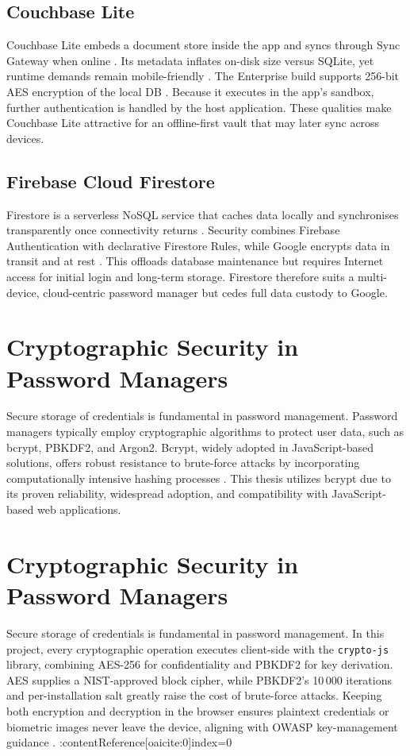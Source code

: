 \subsection*{Couchbase Lite}
Couchbase Lite embeds a document store inside the app and syncs through
Sync Gateway when online \autocite{Pal2016}.  Its metadata inflates on-disk
size versus SQLite, yet runtime demands remain mobile-friendly
\autocite{Gkamas2022}.  The Enterprise build supports 256-bit AES encryption
of the local DB \autocite{CouchbaseEncryption, CouchbaseDoc2025}.  Because it
executes in the app's sandbox, further authentication is handled by the host
application.  These qualities make Couchbase Lite attractive for an
offline-first vault that may later sync across devices.

\subsection*{Firebase Cloud Firestore}
Firestore is a serverless NoSQL service that caches data locally and
synchronises transparently once connectivity returns \autocite{FirebaseDoc2025}.
Security combines Firebase Authentication with declarative Firestore Rules,
while Google encrypts data in transit and at rest \autocite{FirebaseSecurity2025}.
This offloads database maintenance but requires Internet access for initial
login and long-term storage.  Firestore therefore suits a multi-device,
cloud-centric password manager but cedes full data custody to Google.

\section{Cryptographic Security in Password Managers}
Secure storage of credentials is fundamental in password management. Password managers typically employ cryptographic algorithms to protect user data, such as bcrypt, PBKDF2, and Argon2. Bcrypt, widely adopted in JavaScript-based solutions, offers robust resistance to brute-force attacks by incorporating computationally intensive hashing processes \autocite{Pant2022}. This thesis utilizes bcrypt due to its proven reliability, widespread adoption, and compatibility with JavaScript-based web applications.

\section{Cryptographic Security in Password Managers}
Secure storage of credentials is fundamental in password management.  
In this project, every cryptographic operation executes client-side with the
\texttt{crypto-js} library, combining AES-256 for confidentiality and PBKDF2
for key derivation.  AES supplies a NIST-approved block cipher, while
PBKDF2’s 10\,000 iterations and per-installation salt greatly raise the cost
of brute-force attacks.  Keeping both encryption and decryption in the browser
ensures plaintext credentials or biometric images never leave the device,
aligning with OWASP key-management guidance
\autocite{CryptoJS2024, NISTFIPS197, RFC8018, OWASPKeyMgmt2025}. :contentReference[oaicite:0]{index=0}

